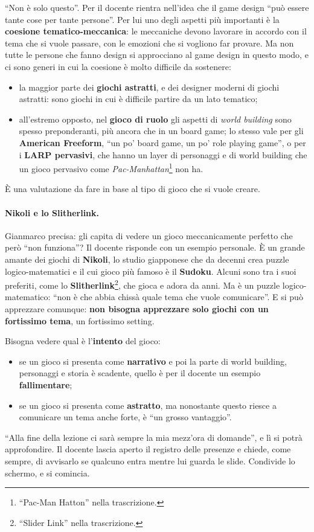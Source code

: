 ``Non è solo questo''. Per il docente rientra nell'idea che il game design ``può
essere tante cose per tante persone''. Per lui uno degli aspetti più importanti è
la \textbf{coesione tematico-meccanica}: le meccaniche devono lavorare in accordo
con il tema che si vuole passare, con le emozioni che si vogliono far provare. Ma
non tutte le persone che fanno design si approcciano al game design in questo
modo, e ci sono generi in cui la coesione è molto difficile da sostenere:
\begin{itemize}
  \item la maggior parte dei \textbf{giochi astratti}, e dei designer moderni di
        giochi astratti: sono giochi in cui è difficile partire da un lato
        tematico;
  \item all'estremo opposto, nel \textbf{gioco di ruolo} gli aspetti di
        \emph{world building} sono spesso preponderanti, più ancora che in un
        board game; lo stesso vale per gli \textbf{American Freeform}, ``un po'
        board game, un po' role playing game'', o per i \textbf{LARP pervasivi},
        che hanno un layer di personaggi e di world building che un gioco
        pervasivo come \emph{Pac-Manhattan}\footnote{``Pac-Man Hatton'' nella
        trascrizione.} non ha.
\end{itemize}
È una valutazione da fare in base al tipo di gioco che si vuole creare.

\paragraph{Nikoli e lo Slitherlink.} Gianmarco precisa: gli capita di vedere un
gioco meccanicamente perfetto che però ``non funziona''? Il docente risponde con
un esempio personale. È un grande amante dei giochi di \textbf{Nikoli}, lo studio
giapponese che da decenni crea puzzle logico-matematici e il cui gioco più famoso
è il \textbf{Sudoku}. Alcuni sono tra i suoi preferiti, come lo
\textbf{Slitherlink}\footnote{``Slider Link'' nella trascrizione.}, che gioca e
adora da anni. Ma è un puzzle logico-matematico: ``non è che abbia chissà quale
tema che vuole comunicare''. E si può apprezzare comunque: \textbf{non bisogna
apprezzare solo giochi con un fortissimo tema}, un fortissimo setting.

Bisogna vedere qual è l'\textbf{intento} del gioco:
\begin{itemize}
  \item se un gioco si presenta come \textbf{narrativo} e poi la parte di world
        building, personaggi e storia è scadente, quello è per il docente un
        esempio \textbf{fallimentare};
  \item se un gioco si presenta come \textbf{astratto}, ma nonostante questo
        riesce a comunicare un tema anche forte, è ``un grosso vantaggio''.
\end{itemize}
``Alla fine della lezione ci sarà sempre la mia mezz'ora di domande'', e lì si
potrà approfondire. Il docente lascia aperto il registro delle presenze e chiede,
come sempre, di avvisarlo se qualcuno entra mentre lui guarda le slide. Condivide
lo schermo, e si comincia.

